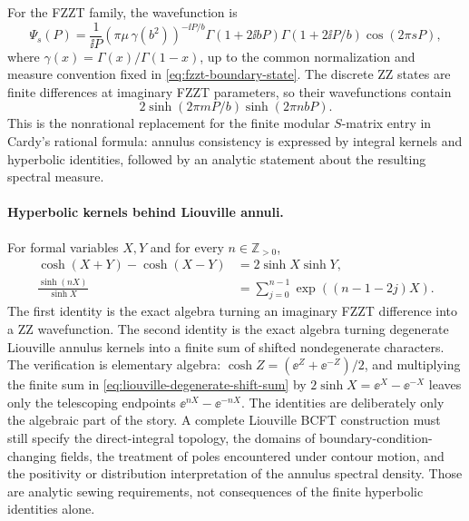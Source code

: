 For the FZZT family, the wavefunction is
\[
  \Psi_s(P)
  =
  \frac1{\ii P}
  \left(\pi\mu\,\gamma(b^2)\right)^{-\ii P/b}
  \Gamma(1+2\ii bP)\Gamma(1+2\ii P/b)
  \cos(2\pi sP),
\]
where \(\gamma(x)=\Gamma(x)/\Gamma(1-x)\), up to the common normalization and
measure convention fixed in
\eqref{eq:fzzt-boundary-state}.  The discrete ZZ states are finite
differences at imaginary FZZT parameters, so their wavefunctions contain
\[
  2\sinh(2\pi mP/b)\sinh(2\pi nbP).
\]
This is the nonrational replacement for the finite modular \(S\)-matrix
entry in Cardy's rational formula: annulus consistency is expressed by
integral kernels and hyperbolic identities, followed by an analytic
statement about the resulting spectral measure.

\paragraph{Hyperbolic kernels behind Liouville annuli.}
For formal variables \(X,Y\) and for every \(n\in\mathbb Z_{>0}\),
\begin{align}
  \cosh(X+Y)-\cosh(X-Y)
  &=
  2\sinh X\sinh Y,
  \label{eq:liouville-zz-hyperbolic-identity}
  \\
  \frac{\sinh(nX)}{\sinh X}
  &=
  \sum_{j=0}^{n-1}\exp\!\left((n-1-2j)X\right).
  \label{eq:liouville-degenerate-shift-sum}
\end{align}
The first identity is the exact algebra turning an imaginary FZZT difference
into a ZZ wavefunction.  The second identity is the exact algebra turning
degenerate Liouville annulus kernels into a finite sum of shifted
nondegenerate characters.  The verification is elementary algebra:
\(\cosh Z=(\ee^Z+\ee^{-Z})/2\), and multiplying the finite sum in
\eqref{eq:liouville-degenerate-shift-sum} by
\(2\sinh X=\ee^X-\ee^{-X}\) leaves only the telescoping endpoints
\(\ee^{nX}-\ee^{-nX}\).  The identities are deliberately only the algebraic
part of the story.  A complete Liouville BCFT construction must still specify
the direct-integral topology, the domains of boundary-condition-changing
fields, the treatment of poles encountered under contour motion, and the
positivity or distribution interpretation of the annulus spectral density.
Those are analytic sewing requirements, not consequences of the finite
hyperbolic identities alone.

